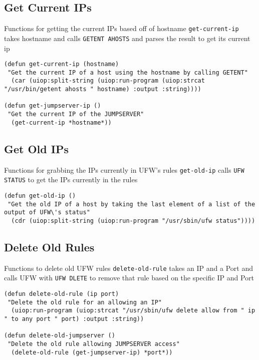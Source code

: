 \documentclass[11pt]{article}
\begin{document}
\subsection{Get Current IPs}
\label{sec:org50200b9}
Functions for getting the current IPs based off of hostname
\texttt{get-current-ip} takes hostname and calls \texttt{GETENT AHOSTS} and parses the result to get its current ip

\begin{verbatim}
(defun get-current-ip (hostname)
 "Get the current IP of a host using the hostname by calling GETENT"
  (car (uiop:split-string (uiop:run-program (uiop:strcat "/usr/bin/getent ahosts " hostname) :output :string))))

(defun get-jumpserver-ip ()
 "Get the current IP of the JUMPSERVER"
  (get-current-ip *hostname*))

\end{verbatim}

\subsection{Get Old IPs}
\label{sec:org4b3c0d1}
Functions for grabbing the IPs currently in UFW's rules
\texttt{get-old-ip} calls \texttt{UFW STATUS} to get the IPs currently in the rules 
\begin{verbatim}
(defun get-old-ip ()
 "Get the old IP of a host by taking the last element of a list of the output of UFW\'s status"
  (cdr (uiop:split-string (uiop:run-program "/usr/sbin/ufw status"))))

\end{verbatim}

\subsection{Delete Old Rules}
\label{sec:orgd222a84}
Functions to delete old UFW rules
\texttt{delete-old-rule} takes an IP and a Port and calls UFW with \texttt{UFW DLETE} to remove that rule based on the specific IP and Port

\begin{verbatim}
(defun delete-old-rule (ip port)
 "Delete the old rule for an allowing an IP"
  (uiop:run-program (uiop:strcat "/usr/sbin/ufw delete allow from " ip " to any port " port) :output :string))

(defun delete-old-jumpserver ()
 "Delete the old rule allowing JUMPSERVER access"
  (delete-old-rule (get-jumpserver-ip) *port*))

\end{verbatim}
\end{document}
